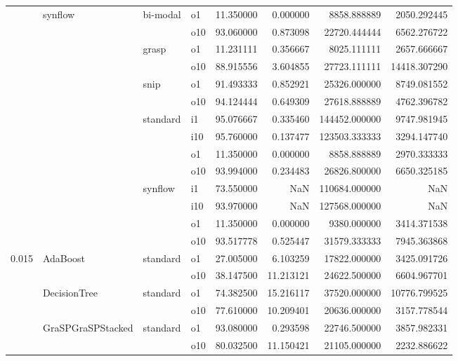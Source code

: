 \begin{longtable}{llllrrrr}
      & synflow & bi-modal & o1 &  11.350000 &   0.000000 &      8858.888889 &   2050.292445 \\
      &     &         & o10 &  93.060000 &   0.873098 &     22720.444444 &   6562.276722 \\
      &     & grasp & o1 &  11.231111 &   0.356667 &      8025.111111 &   2657.666667 \\
      &     &         & o10 &  88.915556 &   3.604855 &     27723.111111 &  14418.307290 \\
      &     & snip & o1 &  91.493333 &   0.852921 &     25326.000000 &   8749.081552 \\
      &     &         & o10 &  94.124444 &   0.649309 &     27618.888889 &   4762.396782 \\
      &     & standard & i1 &  95.076667 &   0.335460 &    144452.000000 &   9747.981945 \\
      &     &         & i10 &  95.760000 &   0.137477 &    123503.333333 &   3294.147740 \\
      &     &         & o1 &  11.350000 &   0.000000 &      8858.888889 &   2970.333333 \\
      &     &         & o10 &  93.994000 &   0.234483 &     26826.800000 &   6650.325185 \\
      &     & synflow & i1 &  73.550000 &        NaN &    110684.000000 &           NaN \\
      &     &         & i10 &  93.970000 &        NaN &    127568.000000 &           NaN \\
      &     &         & o1 &  11.350000 &   0.000000 &      9380.000000 &   3414.371538 \\
      &     &         & o10 &  93.517778 &   0.525447 &     31579.333333 &   7945.363868 \\
0.015 & AdaBoost & standard & o1 &  27.005000 &   6.103259 &     17822.000000 &   3425.091726 \\
      &     &         & o10 &  38.147500 &  11.213121 &     24622.500000 &   6604.967701 \\
      & DecisionTree & standard & o1 &  74.382500 &  15.216117 &     37520.000000 &  10776.799525 \\
      &     &         & o10 &  77.610000 &  10.209401 &     20636.000000 &   3157.778544 \\
      & GraSPGraSPStacked & standard & o1 &  93.080000 &   0.293598 &     22746.500000 &   3857.982331 \\
      &     &         & o10 &  80.032500 &  11.150421 &     21105.000000 &   2232.886622 \\

\end{longtable}
